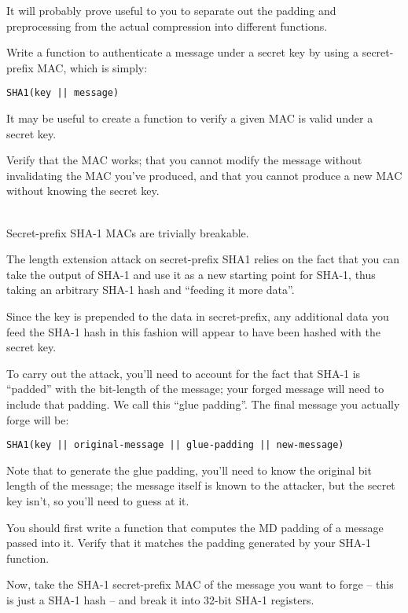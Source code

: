 \documentclass[11pt,oneside]{article}
\newcommand{\sectionfont}{phv} %
\renewcommand{\subsection}[1] {
    \vspace{12pt}{\fontfamily{\sectionfont}\selectfont\large\scshape\textbf{#1}}\\[-10pt]

}
\begin{document}
It will probably prove useful to you to separate out the padding and
preprocessing from the actual compression into different functions.

Write a function to authenticate a message under a secret key by using a
secret-prefix MAC, which is simply:
\begin{lstlisting}[language={}]
	SHA1(key || message)
\end{lstlisting}

It may be useful to create a function to verify a given MAC is valid under a
secret key.

Verify that the MAC works; that you cannot modify the message without
invalidating the MAC you've produced, and that you cannot produce a new MAC
without knowing the secret key.

\subsection{Part 2: Break SHA-1 secret-prefix MAC}

Secret-prefix SHA-1 MACs are trivially breakable.

The length extension attack on secret-prefix SHA1 relies on the fact that you
can take the output of SHA-1 and use it as a new starting point for SHA-1, thus
taking an arbitrary SHA-1 hash and ``feeding it more data''.

Since the key is prepended to the data in secret-prefix, any additional data you
feed the SHA-1 hash in this fashion will appear to have been hashed with the
secret key.

To carry out the attack, you'll need to account for the fact that SHA-1 is
``padded'' with the bit-length of the message; your forged message will need to
include that padding. We call this ``glue padding''. The final message you actually forge will be:
\begin{lstlisting}[language={}]
	SHA1(key || original-message || glue-padding || new-message)
\end{lstlisting}

Note that to generate the glue padding, you'll need to know the original bit
length of the message; the message itself is known to the attacker, but the
secret key isn't, so you'll need to guess at it.

You should first write a function that computes the MD padding of a message
passed into it. Verify that it matches the padding generated by your SHA-1
function.

Now, take the SHA-1 secret-prefix MAC of the message you want to forge -- this
is just a SHA-1 hash -- and break it into 32-bit SHA-1 registers.
\end{document}
